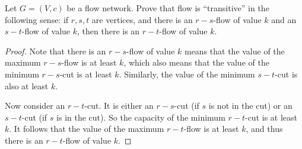 



    \begin{thm}{}{}
        Let $G = (V, c)$ be a flow network. Prove that flow is ``transitive'' in the following sense: if $r, s, t$ are vertices, and there is an $r-s$-flow of value $k$ and an $s-t$-flow of value $k$, then there is an $r-t$-flow of value $k$.
    \end{thm}

    \begin{proof}
        Note that there is an $r-s$-flow of value $k$ means that the value of the maximum $r-s$-flow is at least $k$, which also means that the value of the minimum $r-s$-cut is at least $k$. Similarly, the value of the minimum $s-t$-cut is also at least $k$.
        
        Now consider an $r-t$-cut. It is either an $r-s$-cut (if $s$ is not in the cut) or an $s-t$-cut (if $s$ is in the cut). So the capacity of the minimum $r-t$-cut is at least $k$. It follows that the value of the maximum $r-t$-flow is at least $k$, and thus there is an $r-t$-flow of value $k$.
    \end{proof}




